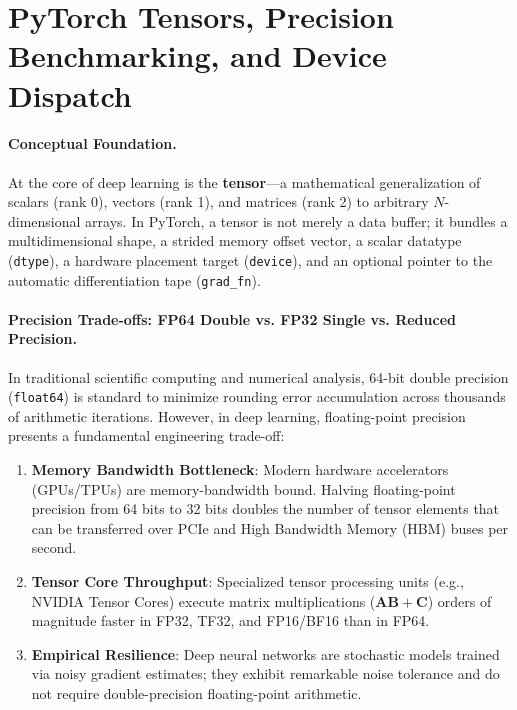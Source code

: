 \documentclass[11pt,a4paper]{article}
\begin{document}
\section[Tensors, Precision, and Hardware Acceleration]{PyTorch Tensors, Precision Benchmarking, and Device Dispatch}

\paragraph{Conceptual Foundation.}
At the core of deep learning is the \textbf{tensor}---a mathematical generalization of scalars (rank 0), vectors (rank 1), and matrices (rank 2) to arbitrary $N$-dimensional arrays. In PyTorch, a tensor is not merely a data buffer; it bundles a multidimensional shape, a strided memory offset vector, a scalar datatype (\texttt{dtype}), a hardware placement target (\texttt{device}), and an optional pointer to the automatic differentiation tape (\texttt{grad\_fn}).

\paragraph{Precision Trade-offs: FP64 Double vs. FP32 Single vs. Reduced Precision.}
In traditional scientific computing and numerical analysis, 64-bit double precision (\texttt{float64}) is standard to minimize rounding error accumulation across thousands of arithmetic iterations. However, in deep learning, floating-point precision presents a fundamental engineering trade-off:

\begin{enumerate}
    \item \textbf{Memory Bandwidth Bottleneck}: Modern hardware accelerators (GPUs/TPUs) are memory-bandwidth bound. Halving floating-point precision from 64 bits to 32 bits doubles the number of tensor elements that can be transferred over PCIe and High Bandwidth Memory (HBM) buses per second.
    \item \textbf{Tensor Core Throughput}: Specialized tensor processing units (e.g., NVIDIA Tensor Cores) execute matrix multiplications ($\mathbf{A} \mathbf{B} + \mathbf{C}$) orders of magnitude faster in FP32, TF32, and FP16/BF16 than in FP64.
    \item \textbf{Empirical Resilience}: Deep neural networks are stochastic models trained via noisy gradient estimates; they exhibit remarkable noise tolerance and do not require double-precision floating-point arithmetic.
\end{enumerate}
\end{document}
